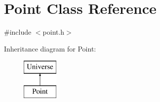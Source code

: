 \hypertarget{classPoint}{}\section{Point Class Reference}
\label{classPoint}


{\ttfamily \#include $<$point.\+h$>$}

Inheritance diagram for Point\+:\begin{figure}[H]
\begin{center}
\leavevmode
\includegraphics[height=2.000000cm]{classPoint}
\end{center}
\end{figure}
